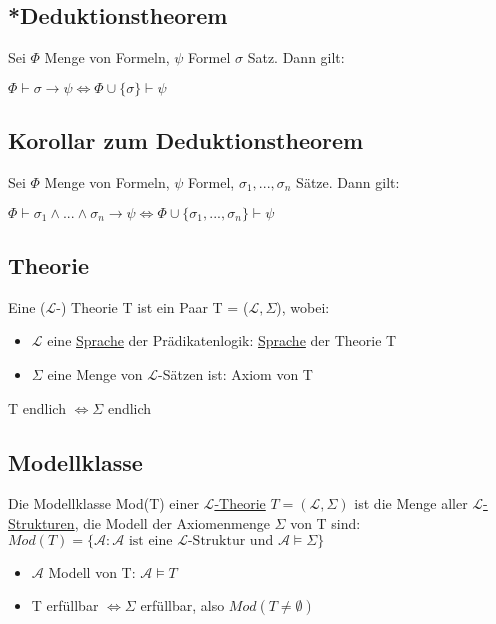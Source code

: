 \documentclass[12pt,a4paper]{article} %
\begin{document}
	\subsection{*Deduktionstheorem}
	Sei $\Phi$ Menge von Formeln, $\psi$ Formel $\sigma$ Satz. Dann gilt: 
	
	$\Phi \hyperref[Beweisbar]{\vdash} \sigma \rightarrow \psi \Leftrightarrow \Phi \cup \{\sigma\} \hyperref[Beweisbar]{\vdash} \psi$
	
	\subsection{Korollar zum Deduktionstheorem}
	Sei $\Phi$ Menge von Formeln, $\psi$ Formel, $\sigma_1, ..., \sigma_n$ Sätze. Dann gilt:
	
	$\Phi \hyperref[Beweisbar]{\vdash} \sigma_1 \land ... \land \sigma_n \rightarrow \psi \Leftrightarrow \Phi \cup \{\sigma_1, ..., \sigma_n\} \hyperref[Beweisbar]{\vdash} \psi$
	
	\subsection{Theorie}
	\label{Theorie}
	Eine ($\mathcal{L}$-) Theorie T ist ein Paar T = ($\mathcal{L}, \Sigma$), wobei:
	\begin{itemize}
		\item $\mathcal{L}$ eine \hyperref[Sprache]{Sprache} der Prädikatenlogik: \hyperref[Sprache]{Sprache} der Theorie T
		\item $\Sigma$ eine Menge von $\mathcal{L}$-Sätzen ist: Axiom von T
	\end{itemize}
	T endlich $\Leftrightarrow \Sigma$ endlich
	
	\subsection{Modellklasse}
	Die Modellklasse Mod(T) einer \hyperref[Theorie]{$\mathcal{L}$-Theorie} $T = (\mathcal{L}, \Sigma)$ ist die Menge aller \hyperref[Struktur]{$\mathcal{L}$-Strukturen}, die Modell der Axiomenmenge $\Sigma$ von T sind: $Mod(T) = \{\mathcal{A} : \mathcal{A} \text{ ist eine } \hyperref[Struktur]{\mathcal{L} \text{-Struktur und } \mathcal{A}} \hyperref[Erfullbar]{\vDash} \Sigma\}$
	\begin{itemize}
		\item $\mathcal{A}$ Modell von T: $\mathcal{A} \hyperref[Erfullbar]{\vDash} T$
		\item T erfüllbar $\Leftrightarrow \Sigma$ erfüllbar, also $Mod(T \ne \emptyset)$
	\end{itemize}
	
\end{document}
